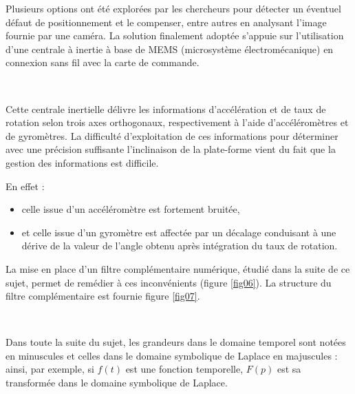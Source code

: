 Plusieurs options ont été explorées par les chercheurs pour détecter un éventuel défaut de positionnement et le compenser, entre autres en analysant l’image fournie par une caméra. La solution finalement adoptée s’appuie sur l’utilisation d’une centrale à inertie à base de MEMS (microsystème électromécanique) en connexion sans
fil avec la carte de commande.

~\

Cette centrale inertielle délivre les informations d’accélération et de taux de rotation selon trois axes orthogonaux, respectivement à l’aide d’accéléromètres et de gyromètres. La difficulté d’exploitation de ces informations
pour déterminer avec une précision suffisante l’inclinaison de la plate-forme vient du fait que la gestion des informations est difficile.

En effet :
\begin{itemize}
 \item celle issue d’un accéléromètre est fortement bruitée,
 \item et celle issue d’un gyromètre est affectée par un décalage conduisant à une dérive de la valeur de l’angle obtenu après intégration du taux de rotation.
\end{itemize}

La mise en place d’un filtre complémentaire numérique, étudié dans la suite de ce sujet, permet de remédier à ces inconvénients (figure \ref{fig06}). La structure du filtre complémentaire est fournie figure \ref{fig07}.

~\



Dans toute la suite du sujet, les grandeurs dans le domaine temporel sont notées en minuscules et celles dans le domaine symbolique de Laplace en majuscules : ainsi, par exemple, si $f(t)$ est une fonction temporelle, $F(p)$ est sa transformée dans le domaine symbolique de Laplace.


\newpage

